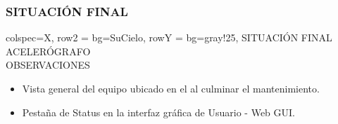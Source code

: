 \subsubsection{SITUACIÓN FINAL}
\begin{tblr}{
    colspec={X},
    row{2} = {bg=SuCielo},
    row{Y} = {bg=gray!25},
}
    SITUACIÓN FINAL \\
    ACELERÓGRAFO \MakeUppercase{} \\
    OBSERVACIONES \\
    \begin{itemize}
        \item Vista general del equipo ubicado en el  al culminar el mantenimiento.
        \item Pestaña de Status en la interfaz gráfica de Usuario - Web GUI.
    \end{itemize}
\end{tblr}
